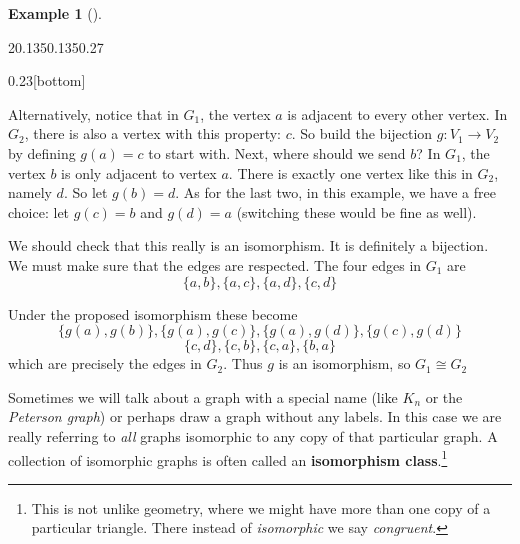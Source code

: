\documentclass[10pt,]{book}
\newcommand{\terminology}[1]{\textbf{#1}}
\theoremstyle{plain}
\theoremstyle{definition}
\theoremstyle{definition}
\newtheorem{example}[theorem]{Example}
\theoremstyle{definition}
\numberwithin{equation}{chapter}
\newcommand{\vtx}[2]{node[fill,circle,inner sep=0pt, minimum size=4pt,label=#1:#2]{}}
\newcommand{\va}[1]{\vtx{above}{#1}}
\newcommand{\vb}[1]{\vtx{below}{#1}}
\newcommand{\vr}[1]{\vtx{right}{#1}}
\newcommand{\vl}[1]{\vtx{left}{#1}}
\begin{document}
\begin{example}[]
\begin{sidebyside}{2}{0.135}{0.135}{0.27}
\begin{sbspanel}{0.23}[bottom]
{{
}
}
\end{sbspanel}
\end{sidebyside}
\par
\hypertarget{p-1294}{}%
Alternatively, notice that in \(G_1\), the vertex \(a\) is adjacent to every other vertex. In \(G_2\), there is also a vertex with this property: \(c\). So build the bijection \(g:V_1 \to V_2\) by defining \(g(a) = c\) to start with. Next, where should we send \(b\)? In \(G_1\), the vertex \(b\) is only adjacent to vertex \(a\). There is exactly one vertex like this in \(G_2\), namely \(d\). So let \(g(b) = d\). As for the last two, in this example, we have a free choice: let \(g(c) = b\) and \(g(d) = a\) (switching these would be fine as well).%
\par
\hypertarget{p-1295}{}%
We should check that this really is an isomorphism. It is definitely a bijection. We must make sure that the edges are respected. The four edges in \(G_1\) are%
\begin{equation*}
\{a,b\}, \{a,c\}, \{a,d\}, \{c,d\}
\end{equation*}
%
\par
\hypertarget{p-1296}{}%
Under the proposed isomorphism these become%
\begin{equation*}
\{g(a), g(b)\}, \{g(a), g(c)\}, \{g(a), g(d)\}, \{g(c), g(d)\}
\end{equation*}
%
\begin{equation*}
\{c,d\}, \{c,b\}, \{c,a\}, \{b,a\}
\end{equation*}
which are precisely the edges in \(G_2\). Thus \(g\) is an isomorphism, so \(G_1 \cong G_2\)%
\end{example}
\hypertarget{p-1297}{}%
Sometimes we will talk about a graph with a special name (like \(K_n\) or the \emph{Peterson graph}) or perhaps draw a graph without any labels. In this case we are really referring to \emph{all} graphs isomorphic to any copy of that particular graph. A collection of isomorphic graphs is often called an \terminology{isomorphism class}.\footnote{This is not unlike geometry, where we might have more than one copy of a particular triangle. There instead of \emph{isomorphic} we say \emph{congruent}.\label{fn-13}}%
\end{document}
